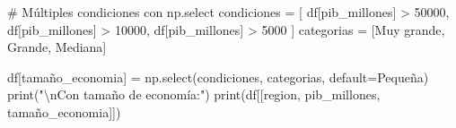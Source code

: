 \documentclass[
  doc,
  floatsintext,
  longtable,
  a4paper,
  nolmodern,
  notxfonts,
  notimes,
  12pt,
  colorlinks=true,linkcolor=blue,citecolor=blue,urlcolor=blue]{apa7}
\newenvironment{Shaded}{\begin{snugshade}}{\end{snugshade}}
\newcommand{\BuiltInTok}[1]{\textcolor[rgb]{0.00,0.23,0.31}{#1}}
\newcommand{\CharTok}[1]{\textcolor[rgb]{0.13,0.47,0.30}{#1}}
\newcommand{\CommentTok}[1]{\textcolor[rgb]{0.37,0.37,0.37}{#1}}
\newcommand{\DecValTok}[1]{\textcolor[rgb]{0.68,0.00,0.00}{#1}}
\newcommand{\NormalTok}[1]{\textcolor[rgb]{0.00,0.23,0.31}{#1}}
\newcommand{\OperatorTok}[1]{\textcolor[rgb]{0.37,0.37,0.37}{#1}}
\newcommand{\StringTok}[1]{\textcolor[rgb]{0.13,0.47,0.30}{#1}}
\begin{document}
\begin{Shaded}
\begin{Highlighting}[]
\CommentTok{\# Múltiples condiciones con np.select}
\NormalTok{condiciones }\OperatorTok{=}\NormalTok{ [}
\NormalTok{    df[}\StringTok{\textquotesingle{}pib\_millones\textquotesingle{}}\NormalTok{] }\OperatorTok{\textgreater{}} \DecValTok{50000}\NormalTok{,}
\NormalTok{    df[}\StringTok{\textquotesingle{}pib\_millones\textquotesingle{}}\NormalTok{] }\OperatorTok{\textgreater{}} \DecValTok{10000}\NormalTok{,}
\NormalTok{    df[}\StringTok{\textquotesingle{}pib\_millones\textquotesingle{}}\NormalTok{] }\OperatorTok{\textgreater{}} \DecValTok{5000}
\NormalTok{]}
\NormalTok{categorias }\OperatorTok{=}\NormalTok{ [}\StringTok{\textquotesingle{}Muy grande\textquotesingle{}}\NormalTok{, }\StringTok{\textquotesingle{}Grande\textquotesingle{}}\NormalTok{, }\StringTok{\textquotesingle{}Mediana\textquotesingle{}}\NormalTok{]}

\NormalTok{df[}\StringTok{\textquotesingle{}tamaño\_economia\textquotesingle{}}\NormalTok{] }\OperatorTok{=}\NormalTok{ np.select(condiciones, categorias, default}\OperatorTok{=}\StringTok{\textquotesingle{}Pequeña\textquotesingle{}}\NormalTok{)}
\BuiltInTok{print}\NormalTok{(}\StringTok{"}\CharTok{\textbackslash{}n}\StringTok{Con tamaño de economía:"}\NormalTok{)}
\BuiltInTok{print}\NormalTok{(df[[}\StringTok{\textquotesingle{}region\textquotesingle{}}\NormalTok{, }\StringTok{\textquotesingle{}pib\_millones\textquotesingle{}}\NormalTok{, }\StringTok{\textquotesingle{}tamaño\_economia\textquotesingle{}}\NormalTok{]])}
\end{Highlighting}
\end{Shaded}
\end{document}
